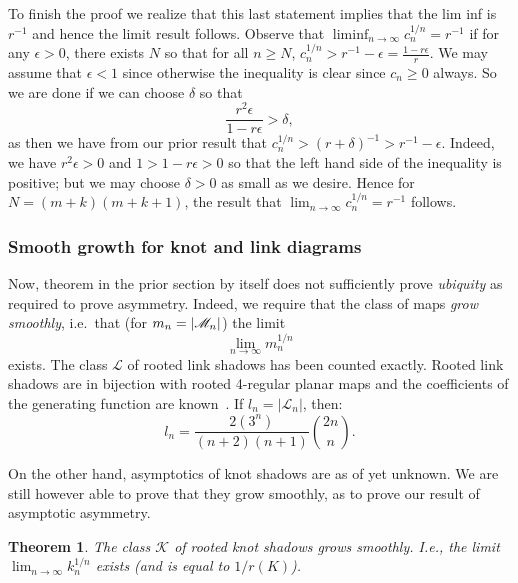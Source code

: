 \documentclass[amsmath,longbibliography,secnumarabic,floatfix,amssymb,nofootinbib,nobibnotes,letterpaper,11pt,notitlepage,preprint]{revtex4-1}
\newcommand{\FlatKnotDia}{\mathscr{K}}
\newcommand{\KnotShad}{\FlatKnotDia}
\newcommand{\LinkShad}{\mathscr{L}}
\newcommand{\arbclass}{c}
\newtheorem{theorem}{Theorem} \newtheorem{corollary}[theorem]{Corollary}
\begin{document}
To finish the proof we realize that this last statement implies that the lim inf is $r^{-1}$ and
hence the limit result follows. Observe that $\liminf_{n\to\infty}{\arbclass_n^{1/n}} = r^{-1}$ if for any
$\epsilon > 0$, there exists $N$ so that for all $n \ge N$, $\arbclass_n^{1/n} > r^{-1} - \epsilon =
\frac{1 - r\epsilon}r$. We may assume that $\epsilon < 1$ since otherwise the inequality is clear
since $\arbclass_n \ge 0$ always. So we are done if we can choose $\delta$ so that
\[ \frac{r^2\epsilon}{1 - r\epsilon} > \delta, \] as then we have from our prior result that
$\arbclass_n^{1/n} > (r + \delta)^{-1} > r^{-1} - \epsilon$. Indeed, we have $r^2\epsilon > 0$ and
$1 > 1 - r\epsilon > 0$ so that the left hand side of the inequality is positive; but we may choose
$\delta > 0$ as small as we desire. Hence for $N = (m+k)(m+k+1)$, the result that
$\lim_{n\to\infty}{\arbclass_n^{1/n}} = r^{-1}$ follows.


\subsubsection{Smooth growth for knot and link diagrams}
\label{sec:smoothgrowth}

Now, theorem in the prior section by itself does not sufficiently prove \emph{ubiquity} as required
to prove asymmetry. Indeed, we require that the class of maps \emph{grow smoothly}, i.e.\ that (for
$m_n = |\mathscr{M}_n|$) the limit
\[ \lim_{n\to\infty}{m_n^{1/n}} \] exists. The class $\LinkShad$ of rooted link shadows has been
counted exactly. Rooted link shadows are in bijection with rooted 4-regular planar maps and the
coefficients of the generating function are known~\cite{chapman2011surveys}. If $l_n =
|\LinkShad_n|$, then:
\[ l_n = \frac{2(3^n)}{(n+2)(n+1)}\binom{2n}{n}. \]

On the other hand, asymptotics of knot shadows are as of yet unknown. We are still however able to
prove that they grow smoothly, as to prove our result of asymptotic asymmetry.
\begin{theorem} The class $\KnotShad$ of rooted knot shadows grows smoothly. I.e., the limit
  $\lim_{n\to\infty}{k_n^{1/n}}$ exists (and is equal to $1/r(K)$).
\end{theorem}
\end{document}
